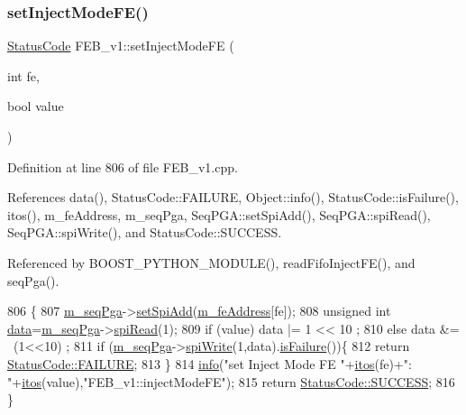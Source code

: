 \subsubsection{\texorpdfstring{set\+Inject\+Mode\+F\+E()}{setInjectModeFE()}}
{\footnotesize\ttfamily \hyperlink{classStatusCode}{Status\+Code} F\+E\+B\+\_\+v1\+::set\+Inject\+Mode\+FE (\begin{DoxyParamCaption}\item[{int}]{fe,  }\item[{bool}]{value }\end{DoxyParamCaption})}



Definition at line 806 of file F\+E\+B\+\_\+v1.\+cpp.



References data(), Status\+Code\+::\+F\+A\+I\+L\+U\+RE, Object\+::info(), Status\+Code\+::is\+Failure(), itos(), m\+\_\+fe\+Address, m\+\_\+seq\+Pga, Seq\+P\+G\+A\+::set\+Spi\+Add(), Seq\+P\+G\+A\+::spi\+Read(), Seq\+P\+G\+A\+::spi\+Write(), and Status\+Code\+::\+S\+U\+C\+C\+E\+SS.



Referenced by B\+O\+O\+S\+T\+\_\+\+P\+Y\+T\+H\+O\+N\+\_\+\+M\+O\+D\+U\+L\+E(), read\+Fifo\+Inject\+F\+E(), and seq\+Pga().


\begin{DoxyCode}
806                                                       \{
807   \hyperlink{classFEB__v1_a6c7804ac86796f233a8393043adf2e77}{m\_seqPga}->\hyperlink{classSeqPGA_ac998ce3a6d9b5f2e88cc8393f8c1df53}{setSpiAdd}(\hyperlink{classFEB__v1_a4e1945c2d5b434125f375e9d0fc6d99f}{m\_feAddress}[fe]);
808   \textcolor{keywordtype}{unsigned} \textcolor{keywordtype}{int} \hyperlink{classFEB__v1_a6bca4320bd3bbbc32efc81097f33421a}{data}=\hyperlink{classFEB__v1_a6c7804ac86796f233a8393043adf2e77}{m\_seqPga}->\hyperlink{classSeqPGA_ab3d0e5e5d4014bc7a92588a76b8713d4}{spiRead}(1);
809   \textcolor{keywordflow}{if} (value)  data |= 1 << 10 ;
810   \textcolor{keywordflow}{else}        data &= ~(1<<10) ;
811   \textcolor{keywordflow}{if} (\hyperlink{classFEB__v1_a6c7804ac86796f233a8393043adf2e77}{m\_seqPga}->\hyperlink{classSeqPGA_ad4421841ce4ce8b88ad13f63216f0743}{spiWrite}(1,data).\hyperlink{classStatusCode_a5dd22dc6eb2c52fc4cabc58f6dea2eb7}{isFailure}())\{
812     \textcolor{keywordflow}{return} \hyperlink{classStatusCode_a6f565cbeadc76d14c72f047e5e85eb4ba3da73d4c469762eb9d3c960368252b26}{StatusCode::FAILURE};
813   \}
814   \hyperlink{classObject_a644fd329ea4cb85f54fa6846484b84a8}{info}(\textcolor{stringliteral}{"set Inject Mode FE "}+\hyperlink{Tools_8h_af330027dbdafb9a30768b3613c553e60}{itos}(fe)+\textcolor{stringliteral}{": "}+\hyperlink{Tools_8h_af330027dbdafb9a30768b3613c553e60}{itos}(value),\textcolor{stringliteral}{"FEB\_v1::injectModeFE"});
815   \textcolor{keywordflow}{return} \hyperlink{classStatusCode_a6f565cbeadc76d14c72f047e5e85eb4badd0da38d3ba0d922efd1f4619bc37ad8}{StatusCode::SUCCESS};
816 \}
\end{DoxyCode}
\mbox{\label{classFEB__v1_ae3252ed2737b5c93395da201b427b871}} 
